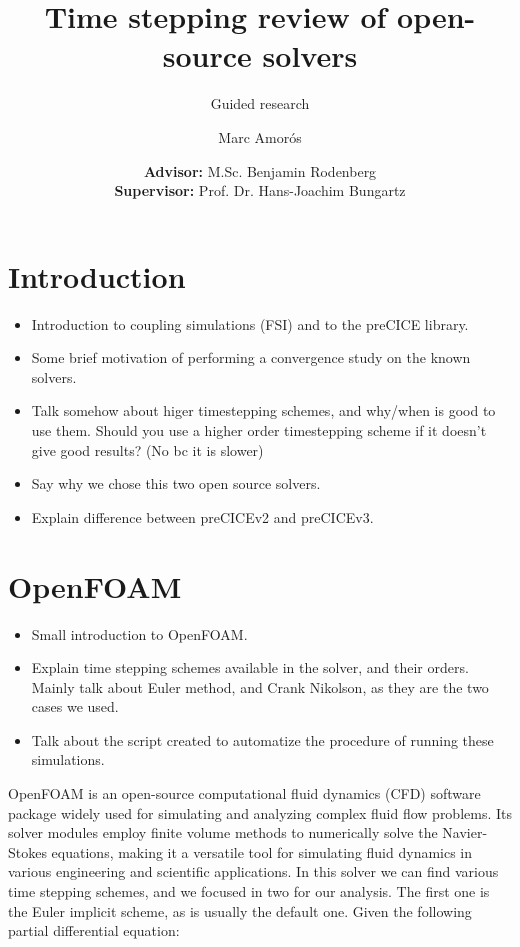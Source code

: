 \documentclass[
  english,        %
  font=times,     %
  onecolumn,      %
]{tumarticle}
\title{Time stepping review of open-source solvers}
\subtitle{Guided research}
\author[email=marc.amoros@tum.de]{Marc Amorós}
\date{
    \small
    \textbf{Advisor:} M.Sc. Benjamin Rodenberg \\
    \textbf{Supervisor:} Prof. Dr. Hans-Joachim Bungartz \\
}
\begin{document}
\maketitle


\section{Introduction}
\begin{itemize}
    \item Introduction to coupling simulations (FSI) and to the preCICE library. 
    \item Some brief motivation of performing a convergence study on the known solvers.
    \item Talk somehow about higer timestepping schemes, and why/when is good to use them. Should you use a higher order timestepping scheme if it doesn't give good results? (No bc it is slower) 
    \item Say why we chose this two open source solvers.
    \item Explain difference between preCICEv2 and preCICEv3.
\end{itemize}


\section{OpenFOAM}
\begin{itemize}
    \item Small introduction to OpenFOAM.
    \item Explain time stepping schemes available in the solver, and their orders. Mainly talk about Euler method, and Crank Nikolson, as they are the two cases we used.
    \item Talk about the script created to automatize the procedure of running these simulations. 
\end{itemize}

OpenFOAM is an open-source computational fluid dynamics (CFD) software package widely used for simulating and analyzing complex fluid flow problems. Its solver modules employ finite volume methods to numerically solve the Navier-Stokes equations, making it a versatile tool for simulating fluid dynamics in various engineering and scientific applications. In this solver we can find various time stepping schemes, and we focused in two for our analysis. The first one is the Euler implicit scheme, as is usually the default one. Given the following partial differential equation:
\end{document}
